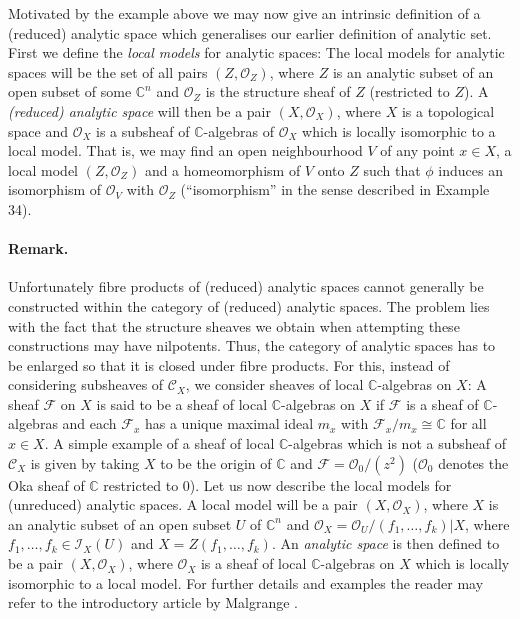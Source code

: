 Motivated by the example above we may now give an intrinsic definition of a (reduced) analytic space which generalises our earlier definition of analytic set. First we define the \emph{local models} for analytic spaces: The local models for analytic spaces will be the set of all pairs $(Z,\mathcal O_Z)$, where $Z$ is an analytic subset of an open subset of some $\mathbb C^n$ and $\mathcal O_Z$ is the structure sheaf of $Z$ (restricted to $Z$). A \emph{(reduced) analytic space} will then be a pair $(X,\mathcal O_X)$, where $X$ is a topological space and $\mathcal O_X$ is a subsheaf of $\mathbb C$-algebras of $\mathcal O_X$ which is locally isomorphic to a local model. That is, we may find an open neighbourhood $V$ of any point $x\in X$, a local model $(Z,\mathcal O_Z)$ and a homeomorphism of $V$ onto $Z$ such that $\phi$ induces an isomorphism of $\mathcal O_V$ with $\mathcal O_Z$ (``isomorphism'' in the sense described in Example 34).

\paragraph{Remark.}
Unfortunately fibre products of (reduced) analytic spaces cannot generally be constructed within the category of (reduced) analytic spaces. The problem lies with the fact that the structure sheaves we obtain when attempting these constructions may have nilpotents. Thus, the category of analytic spaces has to be enlarged so that it is closed under fibre products. For this, instead of considering subsheaves of $\mathcal C_X$, we consider sheaves of local $\mathbb C$-algebras on $X$:
A sheaf $\mathcal F$ on $X$ is said to be a sheaf of local $\mathbb C$-algebras on $X$ if $\mathcal F$ is a sheaf of $\mathbb C$-algebras and each $\mathcal F_x$ has a unique maximal ideal $m_x$ with $\mathcal F_x/m_x\cong\mathbb C$ for all $x\in X$. A simple example of a sheaf of local $\mathbb C$-algebras which is not a subsheaf of $\mathcal C_X$ is given by taking $X$ to be the origin of $\mathbb C$ and $\mathcal F=\mathcal O_0/(z^2)$ ($\mathcal O_0$ denotes the Oka sheaf of $\mathbb C$ restricted to $0$). Let us now describe the local models for (unreduced) analytic spaces. A local model will be a pair $(X,\mathcal O_X)$, where $X$ is an analytic subset of an open subset $U$ of $\mathbb C^n$ and $\mathcal O_X=\mathcal O_U/(f_1,\ldots,f_k)|X$, where $f_1,\ldots,f_k\in\mathcal I_X(U)$ and $X=Z(f_1,\ldots,f_k)$. An \emph{analytic space} is then defined to be a pair $(X,\mathcal O_X)$, where $\mathcal O_X$ is a sheaf of local $\mathbb C$-algebras on $X$ which is locally isomorphic to a local model. For further details and examples the reader may refer to the introductory article by Malgrange \cite{bib:II:malgrange-b:1}.

